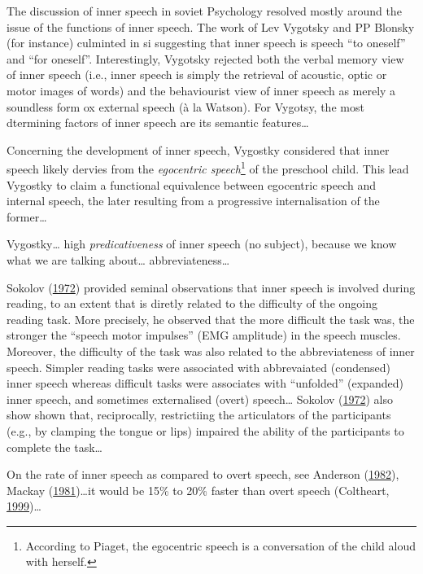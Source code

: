 \documentclass[a4paper,12pt,twoside,openright,oldfontcommands]{memoir}
\let\rmarkdownfootnote\footnote%
\def\footnote{\protect\rmarkdownfootnote}
\begin{document}
The discussion of inner speech in soviet Psychology resolved mostly around the issue of the functions of inner speech. The work of Lev Vygotsky and PP Blonsky (for instance) culminted in si suggesting that inner speech is speech \enquote{to oneself} and \enquote{for oneself}. Interestingly, Vygotsky rejected both the verbal memory view of inner speech (i.e., inner speech is simply the retrieval of acoustic, optic or motor images of words) and the behaviourist view of inner speech as merely a soundless form ox external speech (à la Watson). For Vygotsy, the most dtermining factors of inner speech are its semantic features\ldots{}

Concerning the development of inner speech, Vygostky considered that inner speech likely dervies from the \emph{egocentric speech}\footnote{According to Piaget, the egocentric speech is a conversation of the child aloud with herself.} of the preschool child. This lead Vygostky to claim a functional equivalence between egocentric speech and internal speech, the later resulting from a progressive internalisation of the former\ldots{}

Vygostky\ldots{} high \emph{predicativeness} of inner speech (no subject), because we know what we are talking about\ldots{} abbreviateness\ldots{}

Sokolov (\protect\hyperlink{ref-sokolov_inner_1972}{1972}) provided seminal observations that inner speech is involved during reading, to an extent that is diretly related to the difficulty of the ongoing reading task. More precisely, he observed that the more difficult the task was, the stronger the \enquote{speech motor impulses} (EMG amplitude) in the speech muscles. Moreover, the difficulty of the task was also related to the abbreviateness of inner speech. Simpler reading tasks were associated with abbrevaiated (condensed) inner speech whereas difficult tasks were associates with \enquote{unfolded} (expanded) inner speech, and sometimes externalised (overt) speech\ldots{} Sokolov (\protect\hyperlink{ref-sokolov_inner_1972}{1972}) also show shown that, reciprocally, restrictiing the articulators of the participants (e.g., by clamping the tongue or lips) impaired the ability of the participants to complete the task\ldots{}

On the rate of inner speech as compared to overt speech, see Anderson (\protect\hyperlink{ref-anderson_speech_1982}{1982}), Mackay (\protect\hyperlink{ref-mackay_problem_1981}{1981})\ldots it would be 15\% to 20\% faster than overt speech (Coltheart, \protect\hyperlink{ref-coltheart_phonological_1999}{1999})\ldots{}
\end{document}
